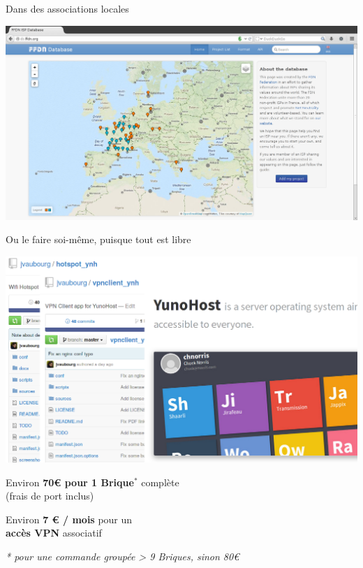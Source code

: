 \documentclass[notes=hide]{beamer}
\begin{document}
\begin{frame}[t]{Dans des associations locales}
\begin{center}
\vfill
\includegraphics[width=\textwidth]{img/25a-capture-ffdn.png}
\vfill
\end{center}
\end{frame}

\begin{frame}[t]{Ou le faire soi-même, puisque tout est libre}
\begin{center}
\vfill
\includegraphics[width=\textwidth]{img/25b-capture-github.png}
\vfill
\end{center}
\end{frame}

\begin{frame}[t]{}
\begin{center}
\vfill
\vfill
{\Large Environ \textbf{70\euro{} pour 1 Brique$^*$} complète \\ (frais de port inclus)}
\vspace{1cm}

{\Large Environ \textbf{7 \euro{} / mois} pour un \\ \textbf{accès VPN} associatif}
\vspace{1cm}
\vfill

{\footnotesize \emph{* pour une commande groupée > 9 Briques, sinon 80\euro}}
\vfill
\end{center}
\end{frame}
\end{document}
